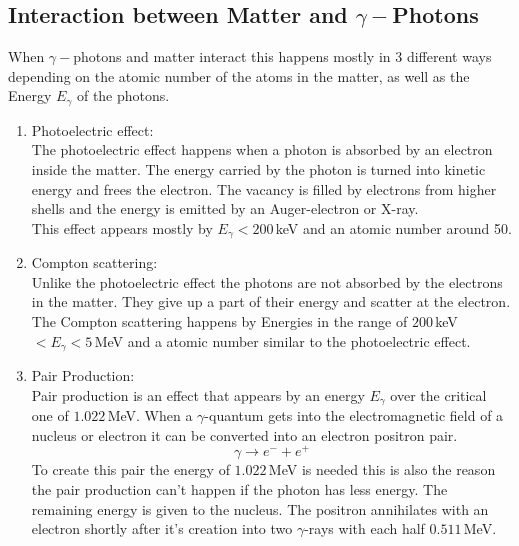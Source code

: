\documentclass[30pt,a4paper]{article}
\begin{document}
	\subsection{Interaction between Matter and $\gamma-$Photons}	
 	When $\gamma-$photons and matter interact this happens mostly in 3 different ways depending on the atomic number of the atoms in the matter, as well as the Energy $E_\gamma$ of the photons.
 	\begin{enumerate}
 		\item Photoelectric effect:\\
 		The photoelectric effect happens when a photon is absorbed by an electron inside the matter. The energy carried by the photon is turned into kinetic energy and frees the electron. The vacancy is filled by electrons from higher shells and the energy is emitted by an Auger-electron or X-ray.\\
 		This effect appears mostly by $E_\gamma<200$\,keV and an atomic number around 50.
 		\item Compton scattering:\\
 		Unlike the photoelectric effect the photons are not absorbed by the electrons in the matter. They give up a part of their energy and scatter at the electron.\\
 		The Compton scattering happens by Energies in the range of $200$\,keV$<E_\gamma<5$\,MeV and a atomic number similar to the photoelectric effect.
 		\item Pair Production:\\
 		Pair production is an effect that appears by an energy $E_\gamma$ over the critical one of $1.022$\,MeV. When a $\gamma$-quantum gets into the electromagnetic field of a nucleus or electron it can be converted into an electron positron pair. 
 		$$\gamma \rightarrow e^- + e^+$$
 		To create this pair the energy of $1.022$\,MeV is needed this is also the reason the pair production can't happen if the photon has less energy. The remaining energy is given to the nucleus. The positron annihilates with an electron shortly after it's creation into two $\gamma$-rays with each half $0.511$\,MeV.
 	\end{enumerate}
\end{document}
